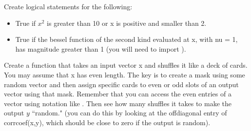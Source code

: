 \begin{problem}
Create logical statements for the following:
\begin{itemize}
\item True if $x^2$ is greater than 10 or x is positive and smaller than 2.
\item True if the bessel function of the second kind evaluated at x, with nu = 1, has magnitude greater than 1 (you will need to import ).
\end{itemize}
\end{problem}

\begin{problem}
Create a function that takes an input vector x and shuffles it like a deck of cards. You may assume that x has even length. The key is to create a mask using some random vector and then assign specific cards to even or odd slots of an output vector using that mask. Remember that you can access the even entries of a vector using notation like . Then see how many shuffles it takes to make the output $y$ ``random." (you can do this by looking at the offdiagonal entry of corrcoef(x,y), which should be close to zero if the output is random).
\end{problem}

